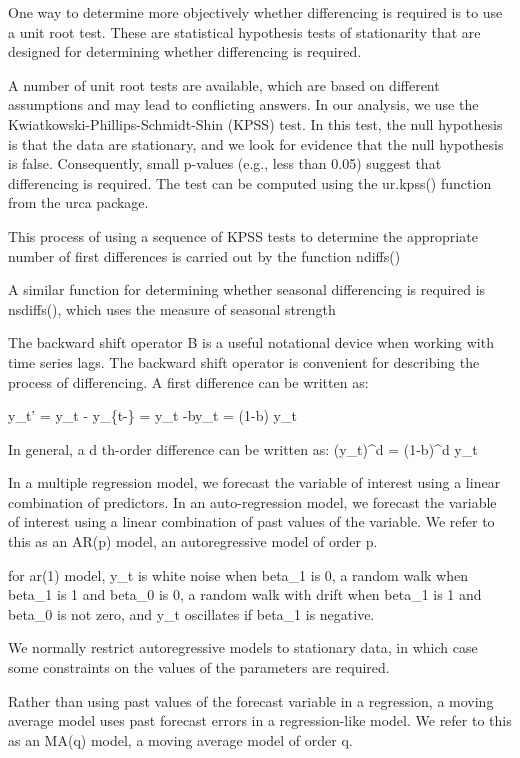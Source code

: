 \documentclass[]{book}
\begin{document}
One way to determine more objectively whether differencing is required
is to use a unit root test. These are statistical hypothesis tests of
stationarity that are designed for determining whether differencing is
required.

A number of unit root tests are available, which are based on different
assumptions and may lead to conflicting answers. In our analysis, we use
the Kwiatkowski-Phillips-Schmidt-Shin (KPSS) test. In this test, the
null hypothesis is that the data are stationary, and we look for
evidence that the null hypothesis is false. Consequently, small p-values
(e.g., less than 0.05) suggest that differencing is required. The test
can be computed using the ur.kpss() function from the urca package.

This process of using a sequence of KPSS tests to determine the
appropriate number of first differences is carried out by the function
ndiffs()

A similar function for determining whether seasonal differencing is
required is nsdiffs(), which uses the measure of seasonal strength

The backward shift operator B is a useful notational device when working
with time series lags. The backward shift operator is convenient for
describing the process of differencing. A first difference can be
written as:

y\_t' = y\_t - y\_\{t-\} = y\_t -by\_t = (1-b) y\_t

In general, a d th-order difference can be written as: (y\_t)\^{}d =
(1-b)\^{}d y\_t

In a multiple regression model, we forecast the variable of interest
using a linear combination of predictors. In an auto-regression model,
we forecast the variable of interest using a linear combination of past
values of the variable. We refer to this as an AR(p) model, an
autoregressive model of order p.

for ar(1) model, y\_t is white noise when beta\_1 is 0, a random walk
when beta\_1 is 1 and beta\_0 is 0, a random walk with drift when
beta\_1 is 1 and beta\_0 is not zero, and y\_t oscillates if beta\_1 is
negative.

We normally restrict autoregressive models to stationary data, in which
case some constraints on the values of the parameters are required.

Rather than using past values of the forecast variable in a regression,
a moving average model uses past forecast errors in a regression-like
model. We refer to this as an MA(q) model, a moving average model of
order q.
\end{document}

